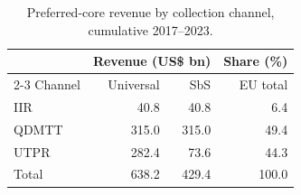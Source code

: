 \begin{table}[H]
\centering
\small
\setlength{\tabcolsep}{4pt}
\caption[Preferred-core revenue by collection channel]{Preferred-core revenue by collection channel, cumulative 2017--2023.}
\label{tab:preferred_channel_updated}
\begin{tabular}{@{}lrrr@{}}
\toprule
 & \multicolumn{2}{c}{Revenue (US\$ bn)} & Share (\%) \\
\cmidrule(lr){2-3}
Channel & Universal & SbS & EU total \\
\midrule
IIR & 40.8 & 40.8 & 6.4 \\
QDMTT & 315.0 & 315.0 & 49.4 \\
UTPR & 282.4 & 73.6 & 44.3 \\
\midrule
Total & 638.2 & 429.4 & 100.0 \\
\bottomrule
\end{tabular}
\end{table}
